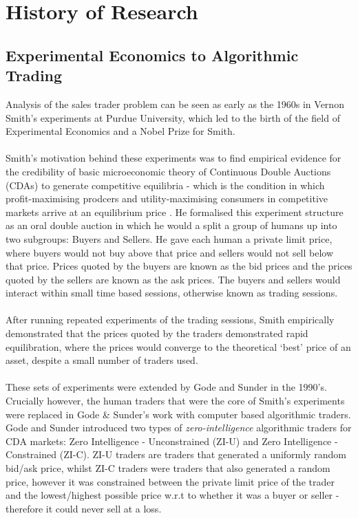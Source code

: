 \documentclass[ %
                    author={Ashwinder Khurana},
                supervisor={Prof Dave Cliff},
                    degree={MEng},
                     title={The Deeply Reinforced Trader},
                  subtitle={},
                      type={enterprise},
                      year={2020} ]{dissertation}
\begin{document}
\section{History of Research}
\label{section:History of Research}
\subsection{Experimental Economics to Algorithmic Trading}
\label{subsection:Experimental Economics to Algorithmic Trading}
Analysis of the sales trader problem can be seen as early as the 1960s in Vernon Smith's experiments at Purdue University, which led to the birth of the field of Experimental Economics and a Nobel Prize for Smith. 
\\
\\
Smith's motivation behind these experiments was to find empirical evidence for the credibility of basic microeconomic theory of Continuous Double Auctions (CDAs) to generate competitive equilibria \cite{MarketEquilibrium} - which is the condition in which profit-maximising prodcers and utility-maximising consumers in competitive markets arrive at an equilibrium price\cite{https://www.investopedia.com/terms/c/competitive-equilibriums.asp} . He formalised this experiment structure as an oral double auction in which he would a split a group of humans up into two subgroups: Buyers and Sellers. He gave each human a private limit price, where buyers would not buy above that price and sellers would not sell below that price. Prices quoted by the buyers are known as the bid prices and the prices quoted by the sellers are known as the ask prices. The buyers and sellers would interact within small time based sessions, otherwise known as trading sessions.
\\
\\
After running repeated experiments of the trading sessions, Smith empirically demonstrated that the prices quoted by the traders demonstrated rapid equilibration, where the prices would converge to the theoretical \enquote*{best} price of an asset, despite a small number of traders used.
\\
\\
These sets of experiments were extended by Gode and Sunder \cite{Gode and Sunder}  in the 1990's. Crucially however, the human traders that were the core of Smith's experiments were replaced in Gode \& Sunder's work with computer based algorithmic traders. Gode and Sunder introduced two types of \textit{zero-intelligence} algorithmic traders for CDA markets: Zero Intelligence - Unconstrained (ZI-U) and Zero Intelligence - Constrained (ZI-C). ZI-U traders are traders that generated a uniformly random bid/ask price, whilst ZI-C traders were traders that also generated a random price, however it was constrained between the private limit price of the trader and the lowest/highest possible price w.r.t to whether it was a buyer or seller - therefore it could never sell at a loss.
\end{document}
